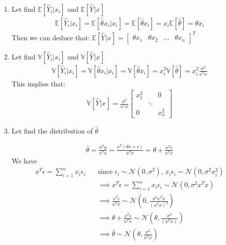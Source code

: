 \documentclass[12pt,a4paper]{article}
\begin{document}
\begin{enumerate}
\item Let find $\mathbb{E}[\widehat{Y}_{i}|x_{i}]$ and $\mathbb{E}[\widehat{Y}_{}|x_{}]$
 \begin{align}
 \mathbb{E}[\widehat{Y}_{i}|x_{i}]=	\mathbb{E}[\widehat{\theta}_{}x_{i}|x_{i}]=\mathbb{E}[\widehat{\theta}x_{i}] = x_{i}\mathbb{E}[\widehat{\theta}] = \theta x_{i}
 \end{align}
Then we can deduce that: $\mathbb{E}[\widehat{Y}_{}|x_{}]=\begin{bmatrix}
	\theta x_{1}&\theta x_{2}&\dots&\theta x_{n}
\end{bmatrix}^{T}$ 
\item Let find  $\mathbb{V}[\hat Y_{i}|x_{i}] $ and $\mathbb{V}[\hat Y_{}|x_{}]  $
\begin{align}
	\mathbb{V}[\hat Y_{i}|x_{i}] = \mathbb{V}[\hat \theta x_{i}|x_{i}]=\mathbb{V}[\hat\theta x_{i}]=x_{i}^{2}\mathbb{V}[\hat \theta] = x_{i}^{2}\frac{\sigma^{2}}{x^{T}x} 
\end{align}
This implies that:\begin{align}
\mathbb{V}[\hat Y_{}|x_{}]=\frac{\sigma^{2}}{x^{T}x}\begin{bmatrix}
		x_{1}^{2}&&0\\
		&\ddots&\\
	    0&&x_{n}^{2}
	\end{bmatrix}
\end{align}

\item Let find the distribution of $\widehat{\theta}$

\begin{align}
\widehat{\theta} = \frac{x^{T}y}{x^{T}x}=\frac{x^{T}(\theta x+\epsilon)}{x^{T}x}=\theta+ \frac{x^{T}\epsilon}{x^{T}x}
\end{align}
We have \begin{align}
	x^{T}\epsilon = \sum_{i=1}^{n}x_{i}\epsilon_{i}\quad &\text{since $\epsilon_{i}\sim\mathcal{N}(0,\sigma^{2})$,  $x_{i}\epsilon_{i}\sim\mathcal{N}(0,\sigma^{2}x_{i}^{2})$}\\
	&\implies x^{T}\epsilon= \sum_{i=1}^{n}x_{i}\epsilon_{i}\sim\mathcal{N}(0,\sigma^{2}x^{T}x)\\
	&\implies \frac{x^{T}\epsilon}{x^{T}x}\sim \mathcal{N}(0,\frac{\sigma^{2}x^{T}x}{(x^{T}x)^{2}})\\
	&\implies \theta+ \frac{x^{T}\epsilon}{x^{T}x}\sim \mathcal{N}(\theta,\frac{\sigma^{2} }{(x^{T}x)^{}})\\
	&\implies \widehat{\theta}\sim\mathcal{N}(\theta,\frac{\sigma^{2} }{x^{T}x^{}})
\end{align}


\end{enumerate}
\end{document}
